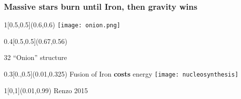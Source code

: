 \documentclass[xcolor=dvipsnames,professionalfonts, aspectratio=169]{beamer}
\begin{document}
\begin{frame}[c]
  \frametitle{Massive stars burn until Iron, then gravity wins}

  \begin{textblock}{1}[0.5,0.5](0.6,0.6)
    \centering
    \texttt{[image: onion.png]}
    \end{textblock}
\begin{textblock}{0.4}[0.5,0.5](0.67,0.56)
    \begin{rotate}{32}
      \centering
      ``Onion'' structure
    \end{rotate}
  \end{textblock}

  \begin{textblock}{0.3}[0.,0.5](0.01,0.325)
    \centering
    Fusion of Iron \textbf{costs} energy
    \texttt{[image: nucleosynthesis]}
  \end{textblock}

  \begin{textblock}{1}[0,1](0.01,0.99)
    \textcolor{gray!50}{\tiny Renzo 2015}\hfill\,
  \end{textblock}
\end{frame}
\end{document}
